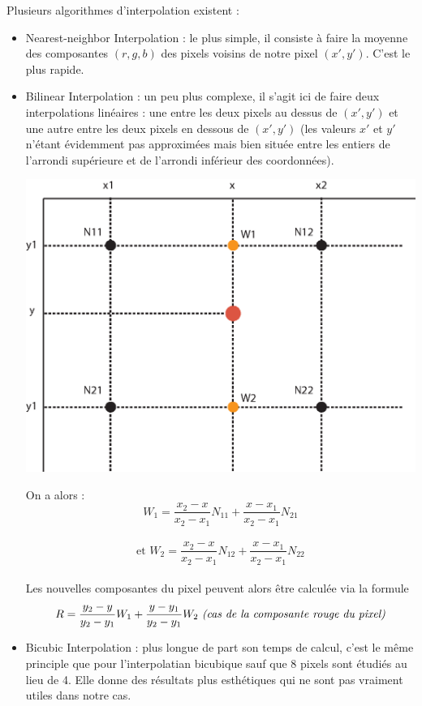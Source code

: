 Plusieurs algorithmes d'interpolation existent :
\begin{itemize}
  \item{Nearest-neighbor Interpolation} : le plus simple, il consiste à faire
    la moyenne des composantes $(r,g,b)$ des pixels voisins de notre pixel
    $(x',y')$. C'est le plus rapide.
  \item{Bilinear Interpolation} : un peu plus complexe, il s'agit ici de faire
    deux interpolations linéaires : une entre les deux pixels au dessus de
    $(x',y')$ et une autre entre les deux pixels en dessous de $(x',y')$ (les
    valeurs $x'$ et $y'$ n'étant évidemment pas approximées mais bien située
    entre les entiers de l'arrondi supérieure et de l'arrondi inférieur des
    coordonnées).
    \begin{center}
      \includegraphics[scale=0.75]{chapters/Pictures/toogy/bilinear.eps}
    \end{center}
    On a alors : \\
    $$W_{1} = \frac{x_{2} - x}{x_{2} - x_{1}} N_{11}
    + \frac{x - x_{1}}{x_{2} - x_{1}} N_{21}$$ \\
    $$\text{et } W_{2} = \frac{x_{2} - x}{x_{2} - x_{1}} N_{12}
    + \frac{x - x_{1}}{x_{2} - x_{1}} N_{22}$$ \\
    Les nouvelles composantes du pixel peuvent alors être calculée via la
    formule \\
    $$R = \frac{y_{2} - y}{y_{2} - y_{1}} W_{1}
    + \frac{y - y_{1}}{y_{2} - y_{1}} W_{2} \text{ \emph{(cas de la
    composante rouge du pixel)}}$$
  \item{Bicubic Interpolation} : plus longue de part son temps de calcul, c'est
    le même principle que pour l'interpolatian bicubique sauf que 8 pixels sont
    étudiés au lieu de 4. Elle donne des résultats plus esthétiques qui ne sont
    pas vraiment utiles dans notre cas.
\end{itemize}

